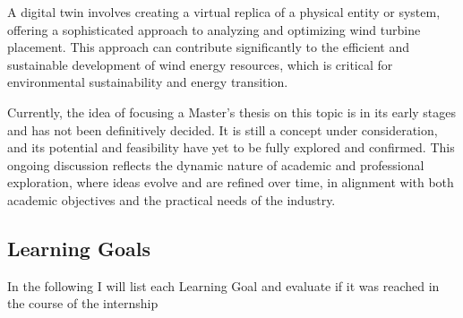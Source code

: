 \documentclass[11pt, titlepage, a4paper]{article}
\begin{document}
A digital twin involves creating a virtual replica of a physical entity or system, offering a sophisticated approach to analyzing and optimizing wind turbine placement. This approach can contribute significantly to the efficient and sustainable development of wind energy resources, which is critical for environmental sustainability and energy transition.

Currently, the idea of focusing a Master's thesis on this topic is in its early stages and has not been definitively decided. It is still a concept under consideration, and its potential and feasibility have yet to be fully explored and confirmed. This ongoing discussion reflects the dynamic nature of academic and professional exploration, where ideas evolve and are refined over time, in alignment with both academic objectives and the practical needs of the industry.

\subsection{Learning Goals}
 In the following I will list each Learning Goal and evaluate if it was reached in the course of the internship
\end{document}
